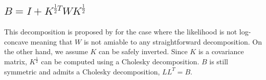 \documentclass[stslayout, noinfoline]{imsart}
\theoremstyle{definition}
\begin{document}

\subsection{$B = I + K^{\frac{1}{2} T} W K^\frac{1}{2}$}

This decomposition is proposed by \citet{Vanhatalo:2021} for the case where the likelihood is not log-concave meaning that $W$ is not amiable to any straightforward decomposition.
On the other hand, we assume $K$ can be safely inverted.
Since $K$ is a covariance matrix, $K^\frac{1}{2}$ can be computed using a Cholesky decomposition.
$B$ is still symmetric and admits a Cholesky decomposition, $LL^T = B$.
\end{document}
